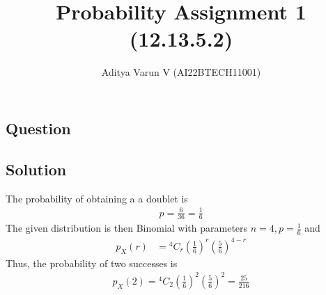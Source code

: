 \documentclass[12pt,twocolumn,notitlepage]{article}
\title{Probability Assignment 1 (12.13.5.2)}
\author{Aditya Varun V (AI22BTECH11001)}
\date{}
\providecommand{\brak}[1]{\ensuremath{\left(#1\right)}}
\newcommand*{\comb}[2]{{}^{#1}C_{#2}}
\begin{document}
\maketitle
\subsection*{Question}


\subsection*{Solution}
\fi
The probability of obtaining a 
a doublet is
\begin{align}
    p = \frac{6}{36} 
    = \frac{1}{6} 
\end{align}
The given distribution is then Binomial with parameters $n = 4, p = \frac{1}{6}$
and
\begin{align}
    p_X\brak{r} &= \comb{4}{r}\brak{\frac{1}{6}}^{r}\brak{\frac{5}{6}}^{4-r} 
\end{align}
Thus, 
 the probability of two successes is
\begin{align}
    p_X\brak{2} = \comb{4}{2}\brak{\frac{1}{6}}^{2}\brak{\frac{5}{6}}^{2} 
    = \frac{25}{216} 
\end{align}
\end{document}
